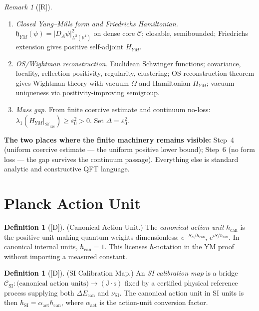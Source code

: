 \documentclass[12pt,oneside]{amsbook}
\theoremstyle{plain}
\theoremstyle{definition}
\newtheorem{definition}[theorem]{Definition}
\theoremstyle{remark}
\newtheorem{remark}[theorem]{Remark}
\newcommand{\status}[1]{\textup{[#1]}}
\begin{document}
\begin{remark}[\status{R}]
\begin{enumerate}[label=\textup{(\arabic*)}]
 $\mathcal{H}_{\mathrm{phys}}=\overline{\mathcal{H}_{\mathrm{pre}}/N_{\mathrm{Gauss}}}$.
 \item \emph{Closed Yang--Mills form and Friedrichs Hamiltonian.}
 $\mathfrak{h}_{YM}(\psi)=|D_A\psi|^2_{L^2(\mathbb{R}^4)}$
 on dense core $\mathcal{C}$; closable, semibounded;
 Friedrichs extension gives positive self-adjoint $H_{YM}$.
 \item \emph{OS/Wightman reconstruction.}
 Euclidean Schwinger functions; covariance, locality, reflection
 positivity, regularity, clustering; OS reconstruction theorem gives
 Wightman theory with vacuum $\Omega$ and Hamiltonian $H_{YM}$;
 vacuum uniqueness via positivity-improving semigroup.
 \item \emph{Mass gap.}
 From finite coercive estimate and continuum no-loss:
 $\lambda_1(H_{YM}|_{\mathcal{H}_{\mathrm{exc}}})\ge\varepsilon_0^2>0$.
 Set $\Delta=\varepsilon_0^2$.
\end{enumerate}
\textbf{The two places where the finite machinery remains visible:}
Step~4 (uniform coercive estimate — the uniform positive lower bound);
Step~6 (no form loss — the gap survives the continuum passage).
Everything else is standard analytic and constructive QFT language.
\end{remark}

\section{Planck Action Unit}\label{sec:Planck}

\begin{definition}[\status{D}]\label{def:canonical-action-unit}
\textup{(Canonical Action Unit.)}
The \emph{canonical action unit} $\hbar_{\mathrm{can}}$ is the
positive unit making quantum weights dimensionless:
$e^{-S_E/\hbar_{\mathrm{can}}}$, $e^{iS/\hbar_{\mathrm{can}}}$.
In canonical internal units, $\hbar_{\mathrm{can}}=1$.
This licenses $\hbar$-notation in the YM proof without importing a
measured constant.
\end{definition}

\begin{definition}[\status{D}]\label{def:SI-calibration-map}
\textup{(SI Calibration Map.)}
An \emph{SI calibration map} is a bridge
$\mathcal{C}_{\mathrm{SI}}:\text{(canonical action units)}\to(\mathrm{J\cdot s})$
fixed by a certified physical reference process supplying
both $\Delta E_{\mathrm{can}}$ and $\nu_{\mathrm{SI}}$.
The canonical action unit in SI units is then
$\hbar_{\mathrm{SI}}=\alpha_{\mathrm{act}}\hbar_{\mathrm{can}}$,
where $\alpha_{\mathrm{act}}$ is the action-unit conversion factor.
\end{definition}
\end{document}
